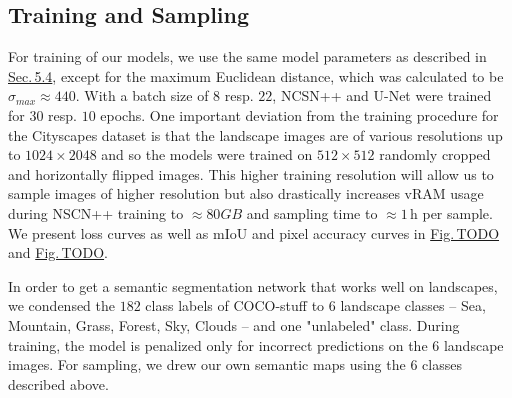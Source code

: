 \subsection{Training and Sampling}
For training of our models, we use the same model parameters as described in \hyperref[sec:5.4]{Sec.\,5.4}, except for the maximum Euclidean distance, which was calculated to be $\sigma_{max}\approx440$. With a batch size of $8$ resp. $22$, NCSN++ and U-Net were trained for $30$ resp. $10$ epochs. One important deviation from the training procedure for the Cityscapes dataset is that the landscape images are of various resolutions up to $1024\times2048$ and so the models were trained on $512\times512$ randomly cropped and horizontally flipped images. This higher training resolution will allow us to sample images of higher resolution but also drastically increases vRAM usage during NSCN++ training to $\approx80GB$ and sampling time to $\approx1$\,h per sample. We present loss curves as well as mIoU and pixel accuracy curves in \hyperref[fig:]{Fig.\,TODO} and \hyperref[fig:]{Fig.\,TODO}.

In order to get a semantic segmentation network that works well on landscapes, we condensed the $182$ class labels of COCO-stuff to $6$ landscape classes – Sea, Mountain, Grass, Forest, Sky, Clouds – and one "unlabeled" class. During training, the model is penalized only for incorrect predictions on the $6$ landscape images. For sampling, we drew our own semantic maps using the $6$ classes described above.

